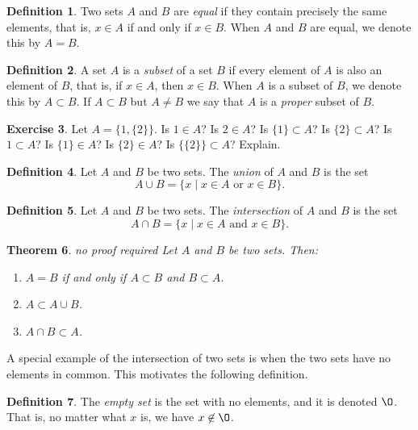 \documentclass[11pt]{article}
\renewcommand{\emptyset}{\O}
\newtheorem{theorem}{Theorem}[section]
\theoremstyle{definition}
\newtheorem{definition}[theorem]{Definition}
\newtheorem{exercise}[theorem]{Exercise}
\numberwithin{equation}{subsection}
\newcommand{\meta}[1]{{\color{green} #1}}
\begin{document}
\begin{definition}  
Two sets $A$ and $B$ are {\em equal} if they contain precisely the same elements, that is, $x\in A$
if and only if $x\in B$.  When $A$ and $B$ are equal, we denote this by $A=B$.
\end{definition}

\begin{definition}  
A set $A$ is a {\em subset} of a set $B$ if every element of $A$ is also an element of $B$, that is,
if $x\in A$, then $x\in B$.  When $A$ is a subset of $B$, we denote this by $A\subset B$.  If $A\subset B$ but $A\neq B$ 
we say that $A$ is a {\em proper} subset of $B.$ 
\end{definition}


\begin{exercise}
Let $A=\{1, \{2\}\}$.  Is $1\in A$?  Is $2\in A$?  Is $\{1\}\subset A$?  Is $\{2\}\subset A$?  
Is $1\subset A$?  Is $\{1\}\in A$?  Is $\{2\}\in A$?  Is $\{\{2\}\}\subset A$?  
Explain.
\end{exercise}

\begin{definition}  Let $A$ and $B$ be two sets. 
The \emph{union} of $A$ and $B$ is the set
\[
A \cup B = \{x \mid \text{$x \in A$ or $x \in B$} \}.
\]
\end{definition}

\begin{definition}  Let $A$ and $B$ be two sets. 
The \emph{intersection} of $A$ and $B$ is the set
\[
A \cap B = \{ x \mid \text{$x \in A$ and $x \in B$} \}.
\]
\end{definition}

\begin{theorem} \label{basicsets} \meta{no proof required}
Let $A$ and $B$ be two sets.  Then:

\begin{enumerate}
\item[a)]
$A=B$ if and only if $A\subset B$ and $B\subset A$.
\item[b)]
$A\subset A\cup B$.

\item[c)]
$A\cap B\subset A$.
\end{enumerate}
\end{theorem}

A special example of the intersection of two sets is when the two sets have no elements in common.
This motivates the following definition.

\begin{definition}  
The \emph{empty set} is the set with no elements, and it is denoted $\emptyset$.  That is,
no matter what $x$ is, we have $x\not\in \emptyset$.
\end{definition}  
\end{document}
